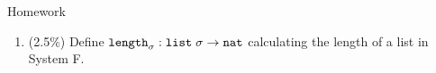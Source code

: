 %
%
%
%
%
%
%

\begin{frame}{Homework}
  \begin{enumerate}
    \item (2.5\%) Define $\mathtt{length}_\sigma : \mathtt{list}\;\sigma \to \mathtt{nat}$ calculating the length of a list in System F.
    
  \end{enumerate}
  
\end{frame}

%
% 


